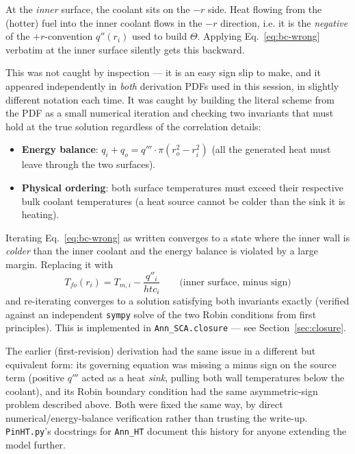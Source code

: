 \documentclass[11pt]{article}
\begin{document}
At the \emph{inner} surface, the coolant sits on the $-r$ side. Heat
flowing from the (hotter) fuel into the inner coolant flows in the $-r$
direction, i.e. it is the \emph{negative} of the $+r$-convention $q''(r_i)$
used to build $\Theta$. Applying Eq.~\ref{eq:bc-wrong} verbatim at the
inner surface silently gets this backward.

This was not caught by inspection --- it is an easy sign slip to make, and
it appeared independently in \emph{both} derivation PDFs used in this
session, in slightly different notation each time. It was caught by
building the literal scheme from the PDF as a small numerical iteration
and checking two invariants that must hold at the true solution regardless
of the correlation details:
\begin{itemize}
\item \textbf{Energy balance}: $q_i + q_o = q'''\!\cdot\!\pi(r_o^2-r_i^2)$
(all the generated heat must leave through the two surfaces).
\item \textbf{Physical ordering}: both surface temperatures must exceed
their respective bulk coolant temperatures (a heat source cannot be colder
than the sink it is heating).
\end{itemize}
Iterating Eq.~\ref{eq:bc-wrong} as written converges to a state where the
inner wall is \emph{colder} than the inner coolant and the energy balance
is violated by a large margin. Replacing it with
\begin{equation}
T_{fo}(r_i) = T_{m,i} - \frac{q''_i}{htc_i} \qquad \text{(inner surface, minus sign)}
\label{eq:bc-fixed}
\end{equation}
and re-iterating converges to a solution satisfying both invariants exactly
(verified against an independent \texttt{sympy} solve of the two Robin
conditions from first principles). This is implemented in
\texttt{Ann\_SCA.closure} --- see Section~\ref{sec:closure}.

The earlier (first-revision) derivation had the same issue in a different
but equivalent form: its governing equation was missing a minus sign on
the source term (positive $q'''$ acted as a heat \emph{sink}, pulling both
wall temperatures below the coolant), and its Robin boundary condition had
the same asymmetric-sign problem described above. Both were fixed the same
way, by direct numerical/energy-balance verification rather than trusting
the write-up. \texttt{PinHT.py}'s docstrings for \texttt{Ann\_HT} document
this history for anyone extending the model further.
\end{document}
